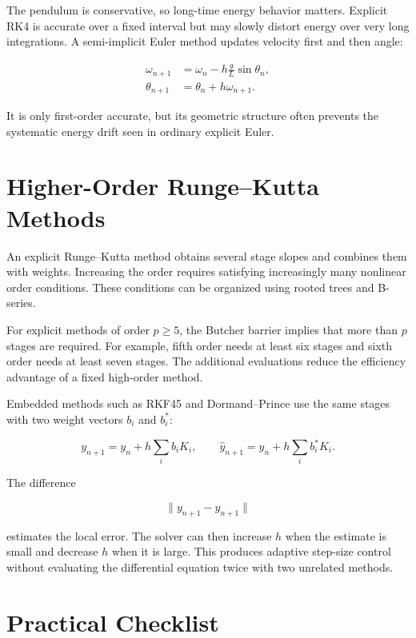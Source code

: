 \documentclass[12pt, a4paper]{article}
\theoremstyle{break}
\begin{document}
The pendulum is conservative, so long-time energy behavior matters. Explicit RK4 is accurate over a fixed interval but may slowly distort energy over very long integrations. A semi-implicit Euler method updates velocity first and then angle:

\[
\begin{aligned}
\omega_{n+1}&=\omega_n-h\frac gL\sin\theta_n,\\
\theta_{n+1}&=\theta_n+h\omega_{n+1}.
\end{aligned}
\]

It is only first-order accurate, but its geometric structure often prevents the systematic energy drift seen in ordinary explicit Euler.

\section{Higher-Order Runge--Kutta Methods}\label{higher-order-rungekutta-methods}

An explicit Runge--Kutta method obtains several stage slopes and combines them with weights. Increasing the order requires satisfying increasingly many nonlinear order conditions. These conditions can be organized using rooted trees and B-series.

For explicit methods of order \(p\ge5\), the Butcher barrier implies that more than \(p\) stages are required. For example, fifth order needs at least six stages and sixth order needs at least seven stages. The additional evaluations reduce the efficiency advantage of a fixed high-order method.

Embedded methods such as RKF45 and Dormand--Prince use the same stages with two weight vectors \(b_i\) and \(b_i^*\):

\[
y_{n+1}=y_n+h\sum_i b_iK_i,
\qquad
\widehat y_{n+1}=y_n+h\sum_i b_i^*K_i.
\]

The difference

\[
\|y_{n+1}-\widehat y_{n+1}\|
\]

estimates the local error. The solver can then increase \(h\) when the estimate is small and decrease \(h\) when it is large. This produces adaptive step-size control without evaluating the differential equation twice with two unrelated methods.

\section{Practical Checklist}\label{practical-checklist}
\end{document}
